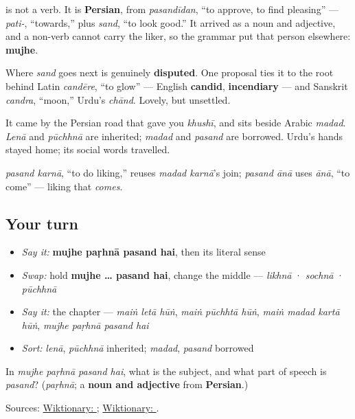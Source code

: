 \begin{cousinweb}
\textbf{} is not a verb. It is \textbf{Persian}, from \textbf{} \emph{pasandīdan}, “to approve, to find pleasing” — \emph{pati-}, “towards,” plus \emph{sand}, “to look good.” It arrived as a noun and adjective, and a non-verb cannot carry the liker, so the grammar put that person elsewhere: \textbf{mujhe}.

Where \emph{sand} goes next is genuinely \textbf{disputed}. One proposal ties it to the root behind Latin \emph{candēre}, “to glow” — English \textbf{candid}, \textbf{incendiary} — and Sanskrit \emph{candra}, “moon,” Urdu's \emph{chānd}. Lovely, but unsettled.

It came by the Persian road that gave you \emph{khushī}, and sits beside Arabic \textbf{} \emph{madad}. \emph{Lenā} and \emph{pūchhnā} are inherited; \emph{madad} and \emph{pasand} are borrowed. Urdu's hands stayed home; its social words travelled.

\textbf{ } \emph{pasand karnā}, “to do liking,” reuses \emph{madad karnā}'s join; \textbf{ } \emph{pasand ānā} uses \textbf{} \emph{ānā}, “to come” — liking that \emph{comes}.
\end{cousinweb}

\subsection*{Your turn}
\begin{itemize}
\raggedright
  \item \emph{Say it:} \textbf{mujhe paṛhnā pasand hai}, then its literal sense
  \item \emph{Swap:} hold \textbf{mujhe … pasand hai}, change the middle — \emph{likhnā} · \emph{sochnā} · \emph{pūchhnā}
  \item \emph{Say it:} the chapter — \emph{maiṅ letā hūṅ}, \emph{maiṅ pūchhtā hūṅ}, \emph{maiṅ madad kartā hūṅ}, \emph{mujhe paṛhnā pasand hai}
  \item \emph{Sort:} \emph{lenā}, \emph{pūchhnā} inherited; \emph{madad}, \emph{pasand} borrowed
\end{itemize}

\begin{tcolorbox}[breakable,colback=teal!4,colframe=teal!35!black,title={Before you move on}]
In \emph{mujhe paṛhnā pasand hai}, what is the subject, and what part of speech is \emph{pasand}? (\emph{paṛhnā}; a \textbf{noun and adjective} from \textbf{Persian}.)

Sources: \href{https://en.wiktionary.org/wiki/\%D9\%BE\%D8\%B3\%D9\%86\%D8\%AF}{Wiktionary: }; \href{https://en.wiktionary.org/wiki/\%D9\%BE\%D8\%B3\%D9\%86\%D8\%AF\%DB\%8C\%D8\%AF\%D9\%86}{Wiktionary: }.
\end{tcolorbox}
